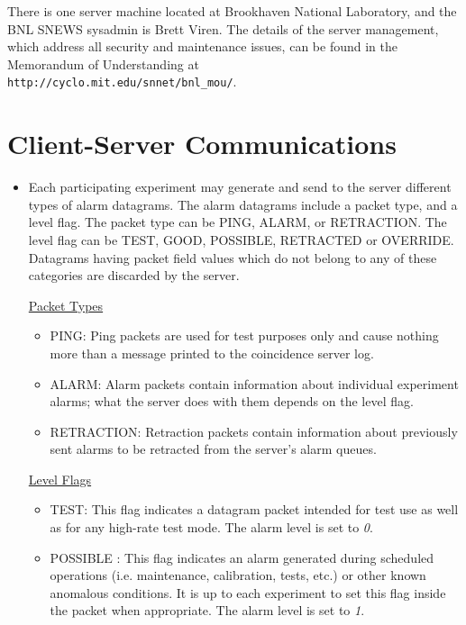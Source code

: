 \documentclass{article}
\begin{document}
There is one server machine located at Brookhaven
National Laboratory, and the BNL SNEWS sysadmin is Brett Viren.
The details of the server management, which address all
security and maintenance issues, can be found
in the Memorandum of Understanding at\\
{\tt http://cyclo.mit.edu/snnet/bnl\_mou/}.

\section{Client-Server Communications}\label{alarm}
\begin{itemize}

\item Each participating experiment may generate and send to the server
different types of alarm datagrams.
The alarm datagrams include a packet type, and a level flag.
The packet type can be PING, ALARM, or RETRACTION.
The level flag can be TEST, GOOD, POSSIBLE, RETRACTED or OVERRIDE.  
Datagrams having packet field values which do not 
belong to any of these categories are discarded by the server.

\noindent \underline{Packet Types}

\begin{itemize}
\item PING: Ping packets are used for test purposes only
and cause nothing more than a message printed to the coincidence
server log.

\item ALARM: Alarm packets contain information about individual
experiment alarms; what the server does with them depends on the
level flag.

\item RETRACTION:  Retraction packets contain information about
previously sent alarms to be retracted from the server's alarm queues.

\end{itemize}

\noindent \underline{Level Flags}

\begin{itemize}

\item TEST: This flag indicates a datagram packet intended for test use
as well as for any high-rate test mode.  The alarm level
is set to {\it 0}.

\item POSSIBLE : This flag indicates an alarm
generated during scheduled operations (i.e. maintenance, calibration,
tests, etc.) or other known anomalous conditions. It is up to each
experiment to set this flag inside the packet when appropriate.  The
alarm level is set to {\it 1}.


\end{itemize}
\end{itemize}
\end{document}
